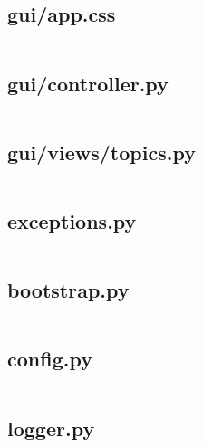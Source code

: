 \documentclass[10pt , a4paper]{report}
\newenvironment{code}{\captionsetup{type=listing}}{}
\begin{document}
\subsection{gui/app.css}
\begin{code}
  \inputminted[fontsize=\small]{text}{../kandy_kafka/gui/app.css}
\end{code}

\subsection{gui/controller.py}
\begin{code}
  \inputminted[fontsize=\small]{Python}{../kandy_kafka/gui/controller.py}
\end{code}

\subsection{gui/views/topics.py}
\begin{code}
  \inputminted[fontsize=\small]{Python}{../kandy_kafka/gui/views/topics.py}
\end{code}

\subsection{exceptions.py}
\begin{code}
  \inputminted[fontsize=\small]{Python}{../kandy_kafka/exceptions.py}
\end{code}

\subsection{bootstrap.py}
\begin{code}
  \inputminted[fontsize=\small]{Python}{../kandy_kafka/bootstrap.py}
\end{code}

\subsection{config.py}
\begin{code}
  \inputminted[fontsize=\small]{Python}{../kandy_kafka/config.py}
\end{code}

\subsection{logger.py}
\begin{code}
  \inputminted[fontsize=\small]{Python}{../kandy_kafka/logger.py}
\end{code}
\end{document}
